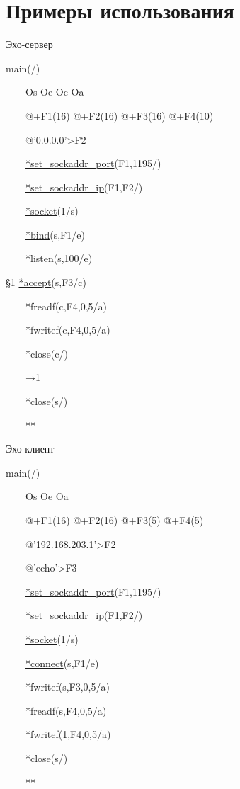 \documentclass[12t,english,russian]{article}
\begin{document}
\section[Примеры использования]{Примеры использования}
\begin{center}
\textcolor[rgb]{1,0,0}{Эхо-сервер}
\end{center}

main(/)

\ \ \ \ Os Oe Oc Oa

\ \ \ \ @+F1(16) @+F2(16) @+F3(16) @+F4(10)

\ \ \ \ @'0.0.0.0'>F2

\ \ \ \ \hyperref[set_sockaddr_port]{*set\_sockaddr\_port}(F1,1195/)

\ \ \ \ \hyperref[set_sockaddr_ip]{*set\_sockaddr\_ip}(F1,F2/)

\ \ \ \ \hyperref[socket]{*socket}(1/s)

\ \ \ \ \hyperref[bind]{*bind}(s,F1/e)

\ \ \ \ \hyperref[listen]{*listen}(s,100/e)

§1 \hyperref[accept]{*accept}(s,F3/c)

\ \ \ \ *freadf(c,F4,0,5/a)	

\ \ \ \ *fwritef(c,F4,0,5/a)

\ \ \ \ *close(c/)

\ \ \ \ →1

\ \ \ \ *close(s/)

\ \ \ \ **

\begin{center}
\textcolor[rgb]{1,0,0}{Эхо-клиент}
\end{center}
main(/)

\ \ \ \ Os Oe Oa 

\ \ \ \ @+F1(16) @+F2(16) @+F3(5) @+F4(5)

\ \ \ \ @'192.168.203.1'>F2

\ \ \ \ @'echo\n'>F3

\ \ \ \ \hyperref[set_sockaddr_port]{*set\_sockaddr\_port}(F1,1195/)

\ \ \ \ \hyperref[set_sockaddr_ip]{*set\_sockaddr\_ip}(F1,F2/)

\ \ \ \ \hyperref[socket]{*socket}(1/s)

\ \ \ \ \hyperref[connect]{*connect}(s,F1/e)

\ \ \ \ *fwritef(s,F3,0,5/a)

\ \ \ \ *freadf(s,F4,0,5/a)

\ \ \ \ *fwritef(1,F4,0,5/a)

\ \ \ \ *close(s/)

\ \ \ \ **
\end{document}
